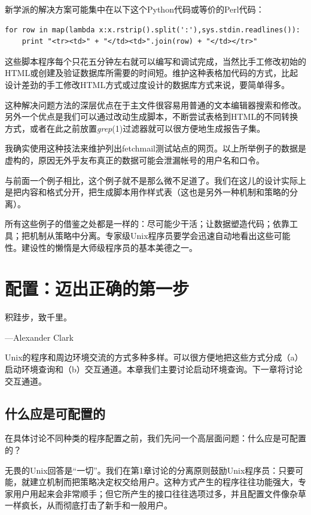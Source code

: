 \documentclass[12pt,oneside]{book}
\begin{document}
新学派的解决方案可能集中在以下这个Python代码或等价的Perl代码：
\begin{Verbatim}
for row in map(lambda x:x.rstrip().split(':'),sys.stdin.readlines()):
    print "<tr><td>" + "</td><td>".join(row) + "</td></tr>"
\end{Verbatim}

这些脚本程序每个只花五分钟左右就可以编写和调试完成，当然比手工修改初始的HTML或创建及验证数据库所需要的时间短。维护这种表格加代码的方式，比起设计差劲的手工修改HTML方式或过度设计的数据库方式来说，要简单得多。

这种解决问题方法的深层优点在于主文件很容易用普通的文本编辑器搜索和修改。另外一个优点是我们可以通过改动生成脚本，不断尝试表格到HTML的不同转换方式，或者在此之前放置\textit{grep}(1)过滤器就可以很方便地生成报告子集。

我确实使用这种技法来维护列出fetchmail测试站点的网页。以上所举例子的数据是虚构的，原因无外乎友布真正的数据可能会泄漏帐号的用户名和口令。

与前面一个例子相比，这个例子就不是那么微不足道了。我们在这儿的设计实际上是把内容和格式分开，把生成脚本用作样式表（这也是另外一种机制和策略的分离）。

所有这些例子的借鉴之处都是一样的：尽可能少干活；让数据塑造代码；依靠工具；把机制从策略中分离。专家级Unix程序员要学会迅速自动地看出这些可能性。建设性的懒惰是大师级程序员的基本美德之一。



\chapter{配置：迈出正确的第一步}
\begin{flushright}
积跬步，致千里。

{\hfill —Alexander Clark}
\end{flushright}

Unix的程序和周边环境交流的方式多种多样。可以很方便地把这些方式分成（a）启动环境查询和（b）交互通道。本章我们主要讨论启动环境查询。下一章将讨论交互通道。

\section{什么应是可配置的}
在具体讨论不同种类的程序配置之前，我们先问一个高层面问题：什么应是可配置的？

无畏的Unix回答是“一切”。我们在第1章讨论的分离原则鼓励Unix程序员：只要可能，就建立机制而把策略决定权交给用户。这种方式产生的程序往往功能强大，专家用户用起来会非常顺手；但它所产生的接口往往选项过多，并且配置文件像杂草一样疯长，从而彻底打击了新手和一般用户。
\end{document}
